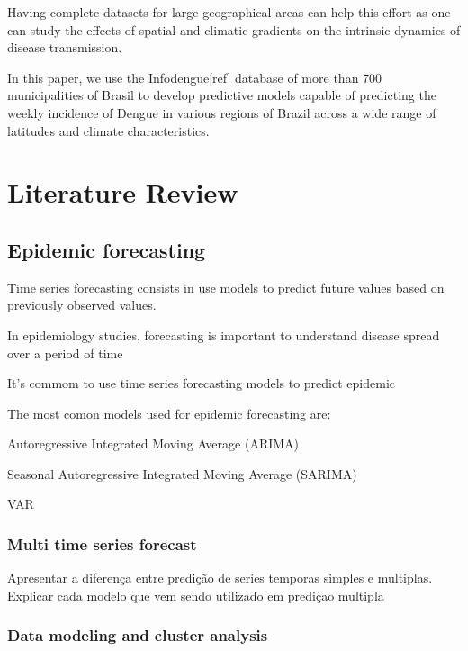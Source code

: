 \documentclass[12pt]{report}
\begin{document}
Having complete datasets for large geographical areas can help this effort as one can study the effects of spatial and climatic gradients on the intrinsic dynamics of disease transmission. 

In this paper, we use the Infodengue[ref] database of more than 700 municipalities of Brasil to develop predictive models capable of predicting the weekly incidence of Dengue in various regions of Brazil across a wide range of latitudes and climate characteristics.

\newpage
\chapter{Literature Review}

\section{Epidemic forecasting}
 
Time series forecasting consists in use models to predict future values based on previously observed values.
 
 
In epidemiology studies, forecasting is important to understand disease spread over a period of time

It's commom to use time series forecasting models to predict epidemic
 
The most comon models used for epidemic forecasting are:
 
 \begin{description}
  \item Autoregressive Integrated Moving Average (ARIMA)
  \item Seasonal Autoregressive Integrated Moving Average (SARIMA)
  \item VAR
 \end{description}

 
\subsection{Multi time series forecast}

Apresentar a diferença entre predição de series temporas simples e multiplas. Explicar cada modelo que vem sendo utilizado em prediçao multipla

\subsection{Data modeling and cluster analysis}
\end{document}
